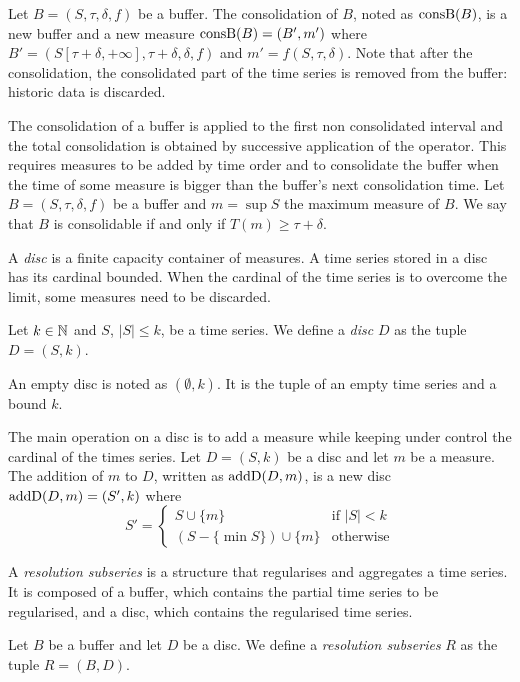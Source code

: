 Let $B=(S,\tau,\delta,f)$ be a buffer. The consolidation of $B$, noted
as $\operatorname{consB}(B)$, is a new buffer and a new measure $\operatorname{consB}(B)=(B',m')$
where $ B'= (S[\tau+\delta,+\infty], \tau+\delta,\delta,f)$ and $m' =
f(S,\tau,\delta)$. Note that after the consolidation, the
consolidated part of the time series is removed from the buffer:
historic data is discarded.

The consolidation of a buffer is applied to the first non consolidated
interval and the total consolidation is obtained by successive
application of the operator. 
%
This requires measures to be added by time order and to consolidate
the buffer when the time of some measure is bigger than the buffer's
next consolidation time.  
%
Let $B=(S,\tau,\delta,f)$ be a buffer and $m=\sup S$ the maximum
measure of $B$. We say that $B$ is consolidable if and only if $T(m)
\geq \tau+\delta$.

A \emph{disc} is a finite capacity container of measures. A time
series stored in a disc has its cardinal bounded. When the cardinal of
the time series is to overcome the limit, some measures need to be
discarded.

\begin{definition}[Disc]
  Let $k\in\mathbb{N}$ and $S$, $|S|\leq k$, be a time series. We define a
  \emph{disc} $D$ as the tuple $D=(S,k)$.
\end{definition}

An empty disc is noted as $(\emptyset,k)$. It is the tuple of an
empty time series and a bound $k$.

The main operation on a disc is to add a measure while keeping under
control the cardinal of the times series. Let $D=(S,k)$ be a disc and
let $m$ be a measure.  The addition of $m$ to $D$, written as
$\operatorname{addD}(D,m)$, is a new disc $\operatorname{addD}(D,m)=(S',k)$ where
%
\[
S' = \begin{cases}
  S\cup\{m\}                 & \text{if } |S|<k  \\
  (S-\{\min S\}) \cup \{m\} & \text{otherwise}
\end{cases}  
\]

A \emph{resolution subseries} is a structure that regularises and
aggregates a time series. It is composed of a buffer, which contains
the partial time series to be regularised, and a disc, which contains
the regularised time series.


\begin{definition}
  Let $B$ be a buffer and let $D$ be a disc.  We define a
  \emph{resolution subseries} $R$ as the tuple $R=(B,D)$.  
\end{definition}
 
